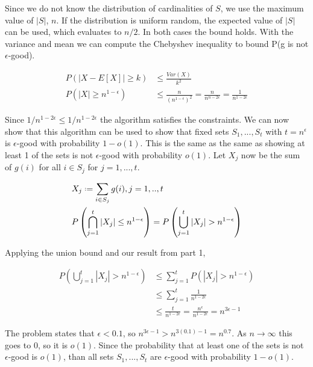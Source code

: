 \documentclass[letterpaper, 11pt]{article}
\newcommand*{\defeq}{\mathrel{\vcenter{\baselineskip0.5ex \lineskiplimit0pt
                     \hbox{\scriptsize.}\hbox{\scriptsize.}}}%
                     =}
\begin{document}
Since we do not know the distribution of cardinalities of $S$, we use the maximum value of $|S|$, $n$. If the distribution is uniform random, the expected value of $|S|$ can be used, which evaluates to $n/2$. In both cases the bound holds. With the variance and mean we can compute the Chebyshev inequality to bound P(g is not $\epsilon$-good). 

\begin{align*}
P(|X-E[X]| \geq k) &\leq \frac{Var(X)}{k^2} \\
P(|X| \geq n^{1-\epsilon}) &\leq \frac{n}{(n^{1-\epsilon})^2} = \frac{n}{n^{n-2\epsilon}} = \frac{1}{n^{1-2\epsilon}}
\end{align*}

Since $1/n^{1-2\epsilon} \leq 1/n^{1-2\epsilon}$ the algorithm satisfies the constraints. We can now show that this algorithm can be used to show that fixed sets $S_1,...,S_t$ with $t=n^\epsilon$ is $\epsilon$-good with probability $1-o(1)$. This is the same as the same as showing at least 1 of the sets is not $\epsilon$-good with probability $o(1)$. Let $X_j$ now be the sum of $g(i)$ for all $i \in S_j$ for $j = 1,...,t$.

\begin{align*}
&X_j \defeq \sum_{i \in S_j} g(i), j= 1,..,t \\
&P\left(\bigcap_{j=1}^t|X_j| \leq n^{1-\epsilon}\right) = P\left(\bigcup_{j=1}^t |X_j| > n^{1-\epsilon} \right) 
\end{align*}

Applying the union bound and our result from part 1,

\begin{align*}
P\left(\bigcup_{j=1}^t |X_j| > n^{1-\epsilon} \right) &\leq \sum_{j=1}^t P(|X_j| > n^{1-\epsilon}) \\
&\leq \sum_{j=1}^t \frac{1}{n^{1-2\epsilon}} \\
&\leq \frac{t}{n^{1-2\epsilon}} = \frac{n^\epsilon}{n^{1-2\epsilon}} = n^{3\epsilon-1}
\end{align*}

The problem states that $\epsilon < 0.1$, so $n^{3\epsilon-1} > n^{3(0.1)-1} = n^{0.7}$. As $n \to \infty$ this goes to 0, so it is $o(1)$. Since the probability that at least one of the sets is not $\epsilon$-good is $o(1)$, than all sets $S_1,...,S_t$ are $\epsilon$-good with probability $1-o(1)$.
\pagebreak
\end{document}
